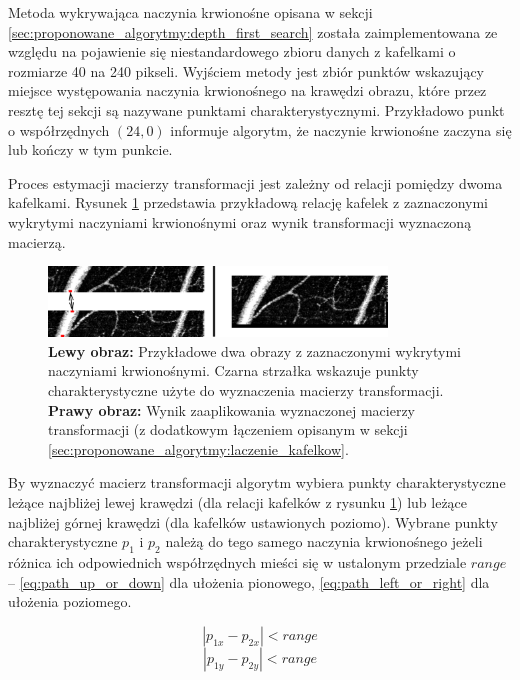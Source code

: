 Metoda wykrywająca naczynia krwionośne opisana w sekcji \ref{sec:proponowane_algorytmy:depth_first_search} została zaimplementowana ze względu na pojawienie się niestandardowego zbioru danych z kafelkami o rozmiarze 40 na 240 pikseli. Wyjściem metody jest zbiór punktów wskazujący miejsce występowania naczynia krwionośnego na krawędzi obrazu, które przez resztę tej sekcji są nazywane punktami charakterystycznymi. Przykładowo punkt o współrzędnych $(24, 0)$ informuje algorytm, że naczynie krwionośne zaczyna się lub kończy w tym punkcie.

Proces estymacji macierzy transformacji jest zależny od relacji pomiędzy dwoma kafelkami. Rysunek \ref{fig:proponowane_algorytmy:path_trans} przedstawia przykładową relację kafelek z zaznaczonymi wykrytymi naczyniami krwionośnymi oraz wynik transformacji wyznaczoną macierzą.

\begin{figure}[H]
  \centering
  \includegraphics[width=9cm]{gfx/path_trans}
  \caption{\textbf{Lewy obraz:} Przykładowe dwa obrazy z zaznaczonymi wykrytymi naczyniami krwionośnymi. Czarna strzałka wskazuje punkty charakterystyczne użyte do wyznaczenia macierzy transformacji. \textbf{Prawy obraz:} Wynik zaaplikowania wyznaczonej macierzy transformacji (z dodatkowym łączeniem opisanym w sekcji \ref{sec:proponowane_algorytmy:laczenie_kafelkow}.}
  \label{fig:proponowane_algorytmy:path_trans}
\end{figure}

By wyznaczyć macierz transformacji algorytm wybiera punkty charakterystyczne leżące najbliżej lewej krawędzi (dla relacji kafelków z rysunku \ref{fig:proponowane_algorytmy:path_trans}) lub leżące najbliżej górnej krawędzi (dla kafelków ustawionych poziomo). Wybrane punkty charakterystyczne $p_{1}$ i $p_{2}$ należą do tego samego naczynia krwionośnego jeżeli różnica ich odpowiednich współrzędnych mieści się w ustalonym przedziale $range$ -- \ref{eq:path_up_or_down} dla ułożenia pionowego, \ref{eq:path_left_or_right} dla ułożenia poziomego.

\begin{equation}
\left|p_{1x}- p_{2x}\right| < range
\label{eq:path_up_or_down}
\end{equation}
\begin{equation}
\left|p_{1y} - p_{2y}\right| < range
\label{eq:path_left_or_right}
\end{equation}

